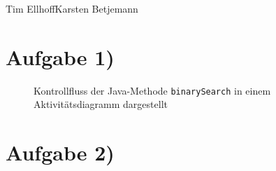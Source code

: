 \documentclass{swp1}
\begin{document}
          {Tim Ellhoff}{Karsten Betjemann}{}
          
\section*{Aufgabe 1)}

\begin{figure}[h]
\caption{Kontrollfluss der Java-Methode \texttt{binarySearch} in einem Aktivitätsdiagramm dargestellt}
\label{ab1}
\end{figure}


\section*{Aufgabe 2)}
\end{document}
